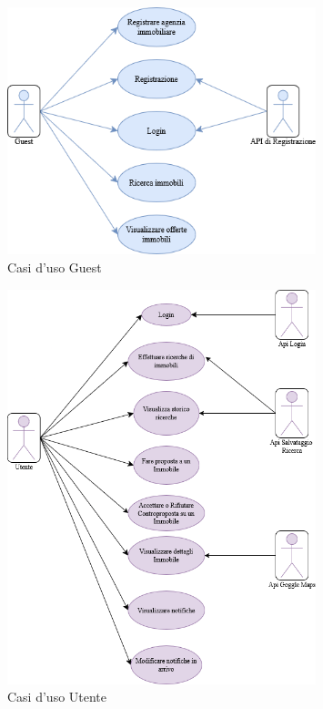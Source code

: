 \begin{figure}[H]
\caption{Casi d'uso Guest}
\centering
\includegraphics[width=0.8\textwidth]{Immagini/Diagrammi Casi D'uso/UseCase-Utente Non Registrato.drawio.png}
\end{figure}

\begin{figure}[H]
\centering
\caption{Casi d'uso Utente}
\includegraphics[width=0.8\textwidth]{Immagini/Diagrammi Casi D'uso/UseCase-Utente registrato.drawio.png}
\end{figure}

